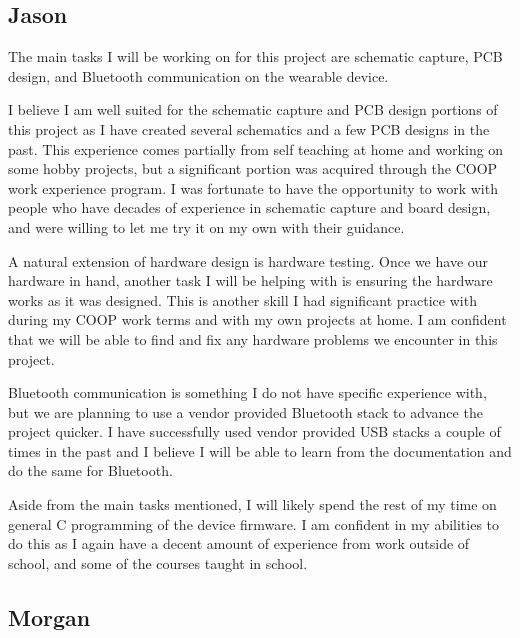 

\subsection{Jason}
	The main tasks I will be working on for this project are schematic 
	capture, PCB design, and Bluetooth communication on the wearable device.
	
	I believe I am well suited for the schematic capture and PCB design portions of
	this project as I have created several schematics and a few PCB designs in the 
	past.  This experience comes partially from self teaching at home and working on
	some hobby projects, but a significant portion was acquired through the COOP
	work experience program.  I was fortunate to have the opportunity to work
	with people who have decades of experience in schematic capture and board design,
	and were willing to let me try it on my own with their guidance.

	A natural extension of hardware design is hardware testing.  Once we have our
	hardware in hand, another task I will be helping with is ensuring the hardware
	works as it was designed.  This is another skill I had significant practice with during
	my COOP work terms and with my own projects at home.  I am confident that we
	will be able to find and fix any hardware problems we encounter in this project.
	
	Bluetooth communication is something I do not have specific experience with,
	but we are planning to use a vendor provided Bluetooth stack to advance the
	project quicker.  I have successfully used vendor provided USB stacks a couple
	of times in the past and I believe I will be able to learn from the documentation 
	and do the same for Bluetooth.

	Aside from the main tasks mentioned, I will likely spend the rest of my time on
	general C programming of the device firmware.  I am confident in my abilities to
	do this as I again have a decent amount of experience from work outside of
	school, and some of the courses taught in school.

\subsection{Morgan}

